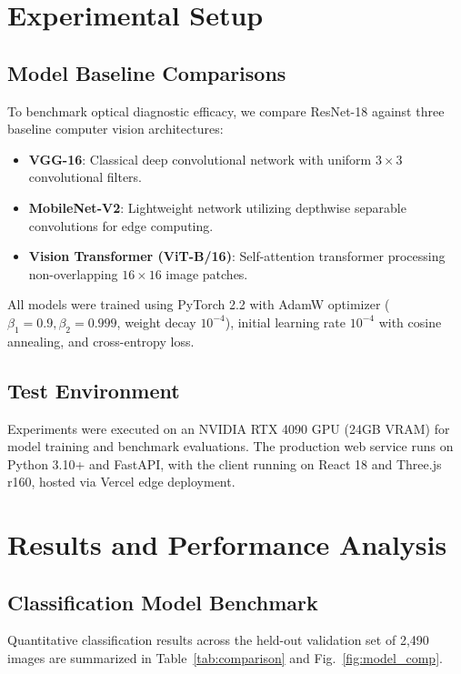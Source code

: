 \documentclass[10pt, conference, letterpaper]{IEEEtran}
\begin{document}
\section{Experimental Setup}

\subsection{Model Baseline Comparisons}
To benchmark optical diagnostic efficacy, we compare ResNet-18 against three baseline computer vision architectures:
\begin{itemize}
    \item \textbf{VGG-16}: Classical deep convolutional network with uniform $3 \times 3$ convolutional filters.
    \item \textbf{MobileNet-V2}: Lightweight network utilizing depthwise separable convolutions for edge computing.
    \item \textbf{Vision Transformer (ViT-B/16)}: Self-attention transformer processing non-overlapping $16 \times 16$ image patches.
\end{itemize}
All models were trained using PyTorch 2.2 with AdamW optimizer ($\beta_1 = 0.9, \beta_2 = 0.999$, weight decay $10^{-4}$), initial learning rate $10^{-4}$ with cosine annealing, and cross-entropy loss.

\subsection{Test Environment}
Experiments were executed on an NVIDIA RTX 4090 GPU (24GB VRAM) for model training and benchmark evaluations. The production web service runs on Python 3.10+ and FastAPI, with the client running on React 18 and Three.js r160, hosted via Vercel edge deployment.

\section{Results and Performance Analysis}

\subsection{Classification Model Benchmark}
Quantitative classification results across the held-out validation set of 2,490 images are summarized in Table~\ref{tab:comparison} and Fig.~\ref{fig:model_comp}.
\end{document}
